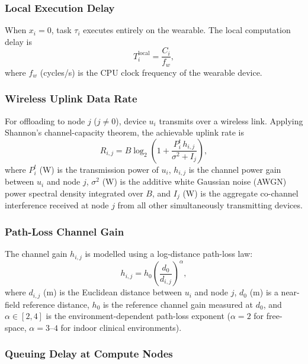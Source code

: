 \documentclass[journal,twoside,letterpaper]{IEEEtran}
\begin{document}
\subsubsection{Local Execution Delay}

When $x_i = 0$, task $\tau_i$ executes entirely on the wearable.  The
local computation delay is
\begin{equation}
  T^{\mathrm{local}}_i = \frac{C_i}{f_w},
  \label{eq:latency_local}
\end{equation}
where $f_w$ (cycles/s) is the CPU clock frequency of the wearable device.

\subsubsection{Wireless Uplink Data Rate}

For offloading to node $j$ ($j \neq 0$), device $u_i$ transmits over a
wireless link.  Applying Shannon's channel-capacity theorem, the achievable
uplink rate is
\begin{equation}
  R_{i,j} = B \log_2\!\left(1 + \frac{P^t_i \, h_{i,j}}{\sigma^2 + I_j}\right),
  \label{eq:shannon_rate}
\end{equation}
where $P^t_i$ (W) is the transmission power of $u_i$, $h_{i,j}$ is the
channel power gain between $u_i$ and node $j$, $\sigma^2$ (W) is the
additive white Gaussian noise (AWGN) power spectral density integrated over
$B$, and $I_j$ (W) is the aggregate co-channel interference received at
node $j$ from all other simultaneously transmitting devices.

\subsubsection{Path-Loss Channel Gain}

The channel gain $h_{i,j}$ is modelled using a log-distance path-loss law:
\begin{equation}
  h_{i,j} = h_0 \left(\frac{d_0}{d_{i,j}}\right)^{\!\alpha},
  \label{eq:channel_gain}
\end{equation}
where $d_{i,j}$ (m) is the Euclidean distance between $u_i$ and node $j$,
$d_0$ (m) is a near-field reference distance, $h_0$ is the reference channel
gain measured at $d_0$, and $\alpha \in [2, 4]$ is the environment-dependent
path-loss exponent ($\alpha = 2$ for free-space, $\alpha = 3$--$4$ for indoor
clinical environments).

\subsubsection{Queuing Delay at Compute Nodes}
\end{document}
